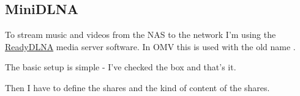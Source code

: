 

\subsection{MiniDLNA}

To stream music and videos from the \gls{NAS} to the network I'm using the
\href{https://sourceforge.net/projects/minidlna/}{ReadyDLNA} media server
software. In \gls{OMV} this is used with the old name .


The basic setup is simple - I've checked the  box and that's
it.


Then I have to define the shares and the kind of content of the shares.

